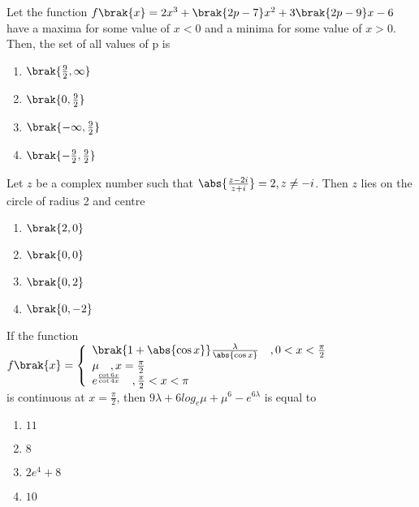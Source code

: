 
\iffalse
  \title{Assignment}
  \author{EE24BTECH11032}
  \section{mcq-single}
\fi

        \item Let the function $f\brak{x}=2x^3+\brak{2p-7}x^2+3\brak{2p-9}x-6$ have a maxima for some value of $x<0$ and a minima for some value of $x>0$. Then, the set of all values of p is \hfill{}
    \begin{enumerate}
        \item $\brak{\frac{9}{2},\infty}$
        \item $\brak{0,\frac{9}{2}}$
        \item $\brak{-\infty,\frac{9}{2}}$
        \item $\brak{-\frac{9}{2},\frac{9}{2}}$
    \end{enumerate}
    \item Let $z$ be a complex number such that $\abs{\frac{z-2i}{z+i}}=2,z\neq-i$. Then $z$ lies on the circle of radius 2 and centre \hfill{}
    \begin{enumerate}
        \item $\brak{2,0}$
        \item $\brak{0,0}$
        \item $\brak{0,2}$
        \item $\brak{0,-2}$
    \end{enumerate}
    \item If the function \\
    $f\brak{x}=\left\{ \begin{array}{ll} \brak{1+\abs{\cos{x}}}\frac{\lambda}{\abs{\cos{x}}} \quad ,0<x < \frac{\pi}{2} \\ \mu \quad, x=\frac{\pi}{2} \\ e^{\frac{\cot6x}{\cot4x}} \quad ,\frac{\pi}{2}<x<\pi \end{array} \right. $\\
    is continuous at
    $x=\frac{\pi}{2}$, then $9\lambda+6log_e\mu+\mu^6-e^{6\lambda}$ is equal to \hfill{}
    \begin{enumerate}
        \item $11$
        \item $8$
        \item $2e^4+8$
        \item $10$
    \end{enumerate}
